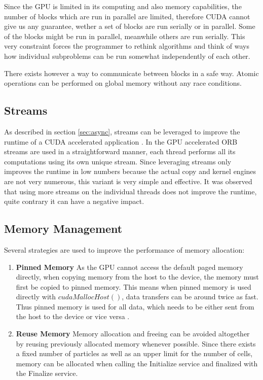 \documentclass[]{article}
\begin{document}
Since the GPU is limited in its computing and also memory capabilities, the number of blocks which are run in parallel are limited, therefore CUDA cannot give us any guarantee, wether a set of blocks are run serially or in parallel. Some of the blocks might be run in parallel, meanwhile others are run serially. This very constraint forces the programmer to rethink algorithms and think of ways how individual subproblems can be run somewhat independently of each other. 

There exists however a way to communicate between blocks in a safe way. Atomic operations can be performed on global memory without any race conditions.

\subsection{Streams}

As described in section \ref{sec:async}, streams can be leveraged to improve the runtime of a CUDA accelerated application \cite{CUDAGuide} \cite{streams}. In the GPU accelerated ORB streams are used in a straightforward manner, each thread performs all its computations using its own unique stream. Since leveraging streams only improves the runtime in low numbers because the actual copy and kernel engines are not very numerous, this variant is very simple and effective. It was observed that using more streams on the individual threads does not improve the runtime, quite contrary it can have a negative impact. 


\subsection{Memory Management}

Several strategies are used to improve the performance of memory allocation: 

\begin{enumerate}
	\item \textbf{Pinned Memory} As the GPU cannot access the default paged memory directly, when copying memory from the host to the device, the memory must first be copied to pinned memory. This means when pinned memory is used directly with $cudaMallocHost()$, data transfers can be around twice as fast. Thus pinned memory is used for all data, which needs to be either sent from the host to the device or vice versa \cite{pinned}. 
	\item \textbf{Reuse Memory} Memory allocation and freeing can be avoided altogether by reusing previously allocated memory whenever possible. Since there exists a fixed number of particles as well as an upper limit for the number of cells, memory can be allocated when calling the Initialize service and finalized with the Finalize service.
\end{enumerate}
\end{document}
